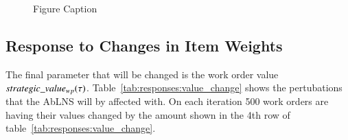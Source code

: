 \begin{figure}[H]%
	\centering
	\resizebox{\linewidth}{!}{
		
	}
	\caption{Figure Caption}
	\label{fig:responses:resource-subtraction}
\end{figure}


\subsection{Response to Changes in Item Weights}
The final parameter that will be changed is the work order value $strategic\_value_{w p}(\tau)$. Table~\ref{tab:responses:value_change} shows
the pertubations that the AbLNS will by affected with. On each iteration 500 work orders are having their values changed by the amount 
shown in the 4th row of table~\ref{tab:responses:value_change}.

